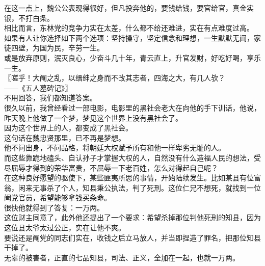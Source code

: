 \begin{multicols}{\theparacolNo}
在这一点上，魏公公表现得很好，但凡投奔他的，要钱给钱，要官给官，真金实银，不打白条。\\

相比而言，东林党的竞争力实在太差，什么都不给还难进，实在有点难度过高。\\

如果有人让你选择如下两个选项：坚持操守，坚定信念和理想，一生默默无闻，家徒四壁，为国为民，辛劳一生。\\

或是放弃原则，泯灭良心，少奋斗几十年，青云直上，升官发财，好吃好喝，享乐一生。\\

〖嗟乎！大阉之乱，以缙绅之身而不改其志者，四海之大，有几人欤？\\

——《五人墓碑记》〗\\

不用回答，我们都知道答案。\\

很久以前，我曾经看过一部电影，电影里的黑社会老大在向他的手下训话，他说，昨天晚上他做了一个梦，梦见这个世界上没有黑社会了。\\

因为这个世界上的人，都变成了黑社会。\\

这句话在魏忠贤那里，已不再是梦想。\\

他不问出身，不问品格，将朝廷大权赋予所有和他一样卑劣无耻的人。\\

而这些靠跪地磕头、自认孙子才掌握大权的人，自然没有什么造福人民的想法，受尽屈辱才得到的荣华富贵，不屈辱一下老百姓，怎么对得起自己呢？\\

在这种良好愿望的驱使下，某些匪夷所思的事情，开始陆续发生。比如某县有位富翁，闲来无事杀了个人，知县秉公执法，判了死刑。这位仁兄不想死，就找到一位阉党官员，希望能够拿钱买条命。\\

很快他就得到了答复：一万两。\\

这位财主同意了，此外他还提出了一个要求：希望杀掉那位判他死刑的知县，因为这位县太爷太过公正，实在让他不爽。\\

要说还是阉党的同志们实在，收钱之后立马放人，并当即捏造了罪名，把那位知县干掉了。\\

无辜的被害者，正直的七品知县，司法、正义，全加在一起，也就一万两。\\


\end{multicols}
